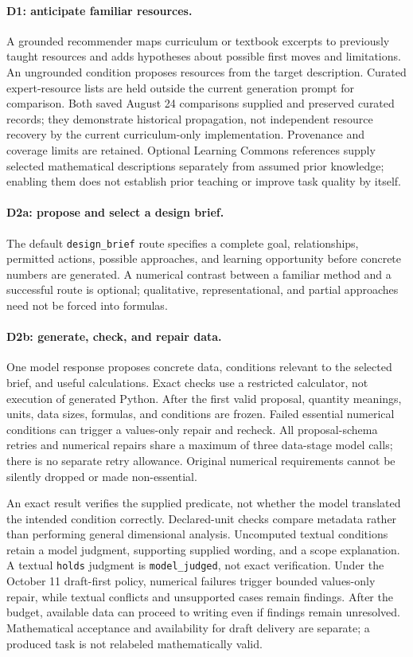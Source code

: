\paragraph{D1: anticipate familiar resources.} A grounded recommender maps curriculum or textbook excerpts to previously taught resources and adds hypotheses about possible first moves and limitations. An ungrounded condition proposes resources from the target description. Curated expert-resource lists are held outside the current generation prompt for comparison. Both saved August 24 comparisons supplied and preserved curated records; they demonstrate historical propagation, not independent resource recovery by the current curriculum-only implementation. Provenance and coverage limits are retained. Optional Learning Commons references supply selected mathematical descriptions separately from assumed prior knowledge; enabling them does not establish prior teaching or improve task quality by itself.

\paragraph{D2a: propose and select a design brief.} The default \texttt{design\_brief} route specifies a complete goal, relationships, permitted actions, possible approaches, and learning opportunity before concrete numbers are generated. A numerical contrast between a familiar method and a successful route is optional; qualitative, representational, and partial approaches need not be forced into formulas.

\paragraph{D2b: generate, check, and repair data.} One model response proposes concrete data, conditions relevant to the selected brief, and useful calculations. Exact checks use a restricted calculator, not execution of generated Python. After the first valid proposal, quantity meanings, units, data sizes, formulas, and conditions are frozen. Failed essential numerical conditions can trigger a values-only repair and recheck. All proposal-schema retries and numerical repairs share a maximum of three data-stage model calls; there is no separate retry allowance. Original numerical requirements cannot be silently dropped or made non-essential.

An exact result verifies the supplied predicate, not whether the model translated the intended condition correctly. Declared-unit checks compare metadata rather than performing general dimensional analysis. Uncomputed textual conditions retain a model judgment, supporting supplied wording, and a scope explanation. A textual \texttt{holds} judgment is \texttt{model\_judged}, not exact verification. Under the October 11 draft-first policy, numerical failures trigger bounded values-only repair, while textual conflicts and unsupported cases remain findings. After the budget, available data can proceed to writing even if findings remain unresolved. Mathematical acceptance and availability for draft delivery are separate; a produced task is not relabeled mathematically valid.

